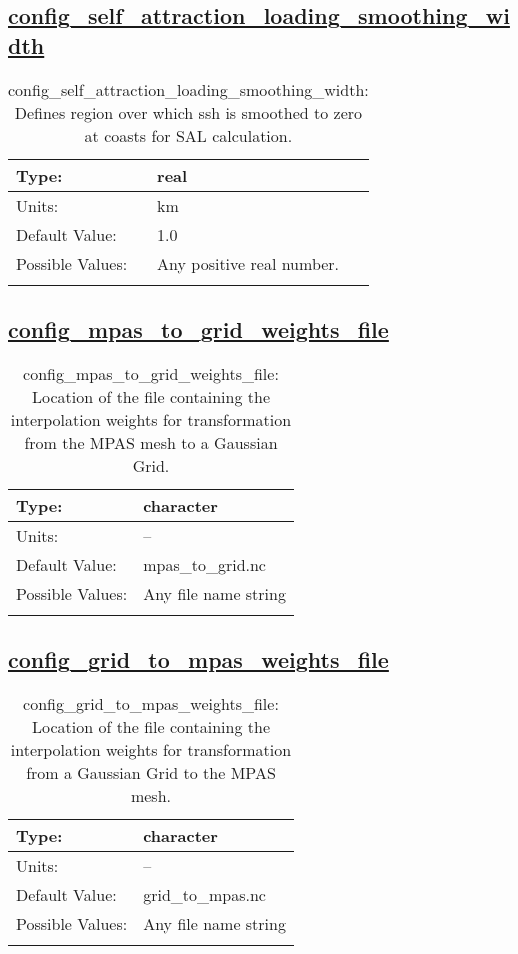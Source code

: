 \subsection[config\_self\_attraction\_loading\_smoothing\_width]{\hyperref[sec:nm_tab_self_attraction_loading]{config\_self\_attraction\_loading\_smoothing\_width}}
\label{subsec:nm_sec_config_self_attraction_loading_smoothing_width}
\begin{center}
\begin{longtable}{| p{2.0in} || p{4.0in} |}
    \hline
    Type: & real \\
    \hline
    Units: & \si{km} \\
    \hline
    Default Value: & 1.0 \\
    \hline
    Possible Values: & Any positive real number. \\
    \hline
    \caption{config\_self\_attraction\_loading\_smoothing\_width: Defines region over which ssh is smoothed to zero at coasts for SAL calculation.}
\end{longtable}
\end{center}
\subsection[config\_mpas\_to\_grid\_weights\_file]{\hyperref[sec:nm_tab_self_attraction_loading]{config\_mpas\_to\_grid\_weights\_file}}
\label{subsec:nm_sec_config_mpas_to_grid_weights_file}
\begin{center}
\begin{longtable}{| p{2.0in} || p{4.0in} |}
    \hline
    Type: & character \\
    \hline
    Units: & -- \\
    \hline
    Default Value: & mpas\_to\_grid.nc \\
    \hline
    Possible Values: & Any file name string \\
    \hline
    \caption{config\_mpas\_to\_grid\_weights\_file: Location of the file containing the interpolation weights for transformation from the MPAS mesh to a Gaussian Grid.}
\end{longtable}
\end{center}
\subsection[config\_grid\_to\_mpas\_weights\_file]{\hyperref[sec:nm_tab_self_attraction_loading]{config\_grid\_to\_mpas\_weights\_file}}
\label{subsec:nm_sec_config_grid_to_mpas_weights_file}
\begin{center}
\begin{longtable}{| p{2.0in} || p{4.0in} |}
    \hline
    Type: & character \\
    \hline
    Units: & -- \\
    \hline
    Default Value: & grid\_to\_mpas.nc \\
    \hline
    Possible Values: & Any file name string \\
    \hline
    \caption{config\_grid\_to\_mpas\_weights\_file: Location of the file containing the interpolation weights for transformation from a Gaussian Grid to the MPAS mesh.}
\end{longtable}
\end{center}
